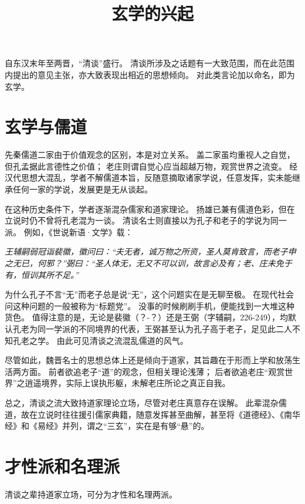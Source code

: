\documentclass[11pt]{article}
\title{玄学的兴起}
\date{}
\begin{document}
\maketitle

\linenumbers

自东汉末年至两晋，“清谈”盛行。
清谈所涉及之话题有一大致范围，而在此范围内提出的意见主张，亦大致表现出相近的思想倾向。
对此类言论加以命名，即为玄学。

\section{玄学与儒道}
先秦儒道二家由于价值观念的区别，本是对立关系。
盖二家虽均重视人之自觉，但孔孟据此言德性之价值；
老庄则谓自觉心应当超越万物，观赏世界之流变。
经汉代思想大混乱，学者不解儒道本旨，反随意摘取诸家学说，任意发挥，实未能继承任何一家的学说，发展更是无从谈起。

\newline

在这种历史条件下，学者逐渐混杂儒家和道家理论。
扬雄已兼有儒道色彩，但在立说时仍不曾将孔老混为一谈。
清谈名士则直接以为孔子和老子的学说为同一派。
例如，《世说新语·文学》载：

\textit{王辅嗣弱冠诣裴徽，徽问曰：“夫无者，诚万物之所资，圣人莫肯致言，而老子申之无已，何邪？”弼曰：“圣人体无，无又不可以训，故言必及有；老、庄未免于有，恒训其所不足。”}

为什么孔子不言“无”而老子总是说“无”，这个问题实在是无聊至极。
在现代社会问这种问题的一般被称为“标题党”。
没事的时候刷刷手机，便能找到一大堆这种货色。
值得注意的是，无论是裴徽（？-？）还是王弼（字辅嗣，226-249），均默认孔老为同一学派的不同境界的代表，王弼甚至认为孔子高于老子，足见此二人不知孔老之学。
由此可见清谈之流混乱儒道的风气。

\newline

尽管如此，魏晋名士的思想总体上还是倾向于道家，其旨趣在于形而上学和放荡生活两方面。
前者欲追老子“道”的观念，但相关理论浅薄；
后者欲追老庄“观赏世界”之逍遥境界，实际上误执形躯，未解老庄所论之真正自我。

\newline

总之，清谈之流大致持道家理论立场，尽管对老庄真意存在误解。
此辈混杂儒道，故在立说时往往援引儒家典籍，随意发挥甚至曲解，甚至将《道德经》、《南华经》和《易经》并列，谓之“三玄”，实在是有够“悬”的。

\section{才性派和名理派}
清谈之辈持道家立场，可分为才性和名理两派。
\end{document}
